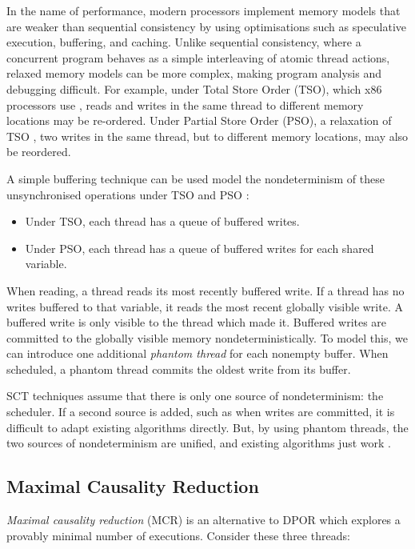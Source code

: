 In the name of performance, modern processors implement memory models
that are weaker than sequential consistency \parencite{lamport1979} by using
optimisations such as speculative execution, buffering, and caching.
Unlike sequential consistency, where a concurrent program behaves as a
simple interleaving of atomic thread actions, relaxed memory models
can be more complex, making program analysis and debugging difficult.
For example, under Total Store Order (TSO), which x86 processors
use \parencite{owens2009}, reads and writes in the same thread to different
memory locations may be re-ordered.  Under Partial Store Order (PSO),
a relaxation of TSO \parencite{sparc}, two writes in the same thread, but to
different memory locations, may also be reordered.

A simple buffering technique can be used model the nondeterminism of
these unsynchronised operations under TSO and PSO \parencite{zhang2015}:

\begin{itemize}
\item Under TSO, each thread has a queue of buffered writes.
\item Under PSO, each thread has a queue of buffered writes for each shared
variable.
\end{itemize}

When reading, a thread reads its most recently buffered write.  If a
thread has no writes buffered to that variable, it reads the most
recent globally visible write.  A buffered write is only visible to
the thread which made it.  Buffered writes are committed to the
globally visible memory nondeterministically.  To model this, we can
introduce one additional \emph{phantom thread} for each nonempty
buffer.  When scheduled, a phantom thread commits the oldest write
from its buffer.

SCT techniques assume that there is only one source of nondeterminism:
the scheduler.  If a second source is added, such as when writes are
committed, it is difficult to adapt existing algorithms directly.
But, by using phantom threads, the two sources of nondeterminism are
unified, and existing algorithms just work \parencite{zhang2015}.

\subsection{Maximal Causality Reduction}

\emph{Maximal causality reduction} (MCR) \parencite{huang2015,huang2017} is
an alternative to DPOR which explores a provably minimal number of
executions.  Consider these three threads:

